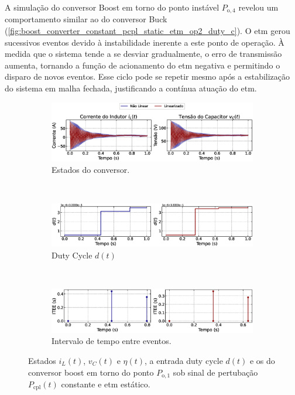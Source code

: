 A simulação do conversor Boost em torno do ponto instável $P_{\mathrm{o}, 4}$ revelou um comportamento similar ao do conversor Buck (\autoref{fig:boost_converter_constant_pcpl_static_etm_op2_duty_c}). O \acrshort{etm} gerou sucessivos eventos devido à instabilidade inerente a este ponto de operação. À medida que o sistema tende a se desviar gradualmente, o erro de transmissão aumenta, tornando a função de acionamento do \acrshort{etm}  negativa e permitindo o disparo de novos eventos. Esse ciclo pode se repetir mesmo após a estabilização do sistema em malha fechada, justificando a contínua atuação do \acrshort{etm}.

\begin{figure}[H]
  \centering
  \captionsetup{justification=centering}
  \begin{subfigure}{1.\textwidth}
    \centering
    \includegraphics[width=1.\textwidth]{figuras/dynamic-etm/boost/sim2/op1/result.eps}
    \caption{Estados do conversor.}
    \label{fig:boost_converter_constant_pcpl_dynamic_etm_op1_a}
  \end{subfigure}
  \\[6pt]
  \begin{subfigure}{1.\textwidth}
    \centering
    \includegraphics[width=1.\textwidth]{figuras/dynamic-etm/boost/sim2/op1/duty-cycle.eps}
    \caption{Duty Cycle $d(t)$}
    \label{fig:boost_converter_constant_pcpl_dynamic_etm_op1_b}
  \end{subfigure}
  \\[6pt]
  \begin{subfigure}{1.\textwidth}
    \centering
    \includegraphics[width=1.\textwidth]{figuras/dynamic-etm/boost/sim2/op1/inter-event-times.eps}
    \caption{Intervalo de tempo entre eventos.}
    \label{fig:boost_converter_constant_pcpl_dynamic_etm_op1_c}
  \end{subfigure}
  \caption{Estados $i_L(t)$, $v_C(t)$ e $\eta(t)$, a entrada duty cycle $d(t)$ e os  do conversor boost em torno do ponto $P_{\mathrm{o}, 1}$ sob sinal de pertubação $P_{\mathrm{cpl}}(t)$ constante e \acrshort{etm} estático.}
  \label{fig:boost_converter_constant_pcpl_dynamic_etm_op1}
\end{figure}

